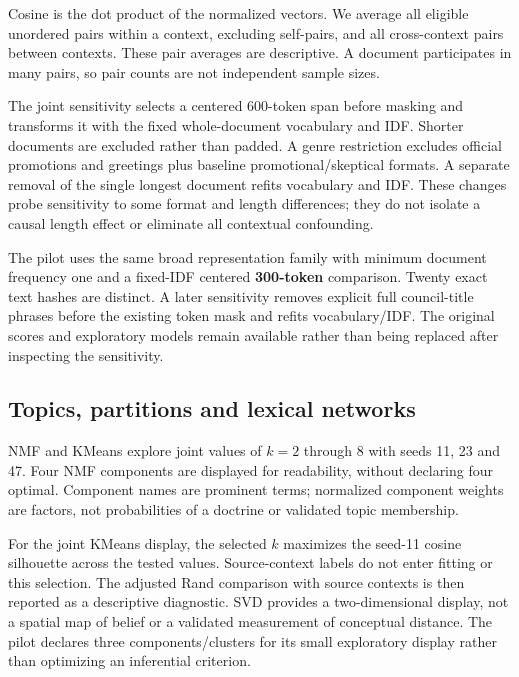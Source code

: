 \documentclass[
  11pt,
]{article}
\begin{document}
Cosine is the dot product of the normalized vectors. We average all
eligible unordered pairs within a context, excluding self-pairs, and all
cross-context pairs between contexts. These pair averages are
descriptive. A document participates in many pairs, so pair counts are
not independent sample sizes.

The joint sensitivity selects a centered 600-token span before masking
and transforms it with the fixed whole-document vocabulary and IDF.
Shorter documents are excluded rather than padded. A genre restriction
excludes official promotions and greetings plus baseline
promotional/skeptical formats. A separate removal of the single longest
document refits vocabulary and IDF. These changes probe sensitivity to
some format and length differences; they do not isolate a causal length
effect or eliminate all contextual confounding.

The pilot uses the same broad representation family with minimum
document frequency one and a fixed-IDF centered \textbf{300-token}
comparison. Twenty exact text hashes are distinct. A later sensitivity
removes explicit full council-title phrases before the existing token
mask and refits vocabulary/IDF. The original scores and exploratory
models remain available rather than being replaced after inspecting the
sensitivity.

\FloatBarrier

\subsection{Topics, partitions and lexical
networks}\label{topics-partitions-and-lexical-networks}

NMF and KMeans explore joint values of \(k=2\) through \(8\) with seeds
11, 23 and 47. Four NMF components are displayed for readability,
without declaring four optimal. Component names are prominent terms;
normalized component weights are factors, not probabilities of a
doctrine or validated topic membership.

For the joint KMeans display, the selected \(k\) maximizes the seed-11
cosine silhouette across the tested values. Source-context labels do not
enter fitting or this selection. The adjusted Rand comparison with
source contexts is then reported as a descriptive diagnostic. SVD
provides a two-dimensional display, not a spatial map of belief or a
validated measurement of conceptual distance. The pilot declares three
components/clusters for its small exploratory display rather than
optimizing an inferential criterion.
\end{document}
